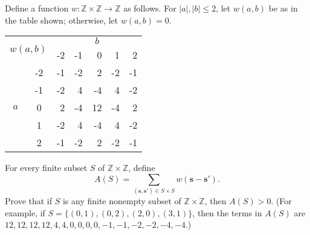 Define a function $w: \mathbb{Z} \times \mathbb{Z} \to \mathbb{Z}$
as follows. For $\left| a \right|, \left| b \right| \leq 2$,
let $w(a,b)$ be as in the table shown; otherwise, let $w(a,b) = 0$.
\begin{center}
\begin{tabular}{|cc|r|r|r|r|r|}
\hline
\multicolumn{2}{|c|}{\multirow{2}{*}{$w(a,b)$}} & \multicolumn{5}{|c|}{$b$} \\
&  & -2 & -1 & 0 & 1 & 2 \\
\hline
& -2 & -1 & -2 & 2 & -2 & -1 \\
& -1 & -2 & 4 & -4 & 4 & -2 \\
$a$ & 0 & 2 & -4 & 12 & -4 & 2 \\
& 1 & -2 & 4 & -4 & 4 & -2 \\ 
& 2 &  -1 & -2 & 2 & -2 & -1 \\
\hline
\end{tabular}
\end{center}
For every finite subset $S$ of $\mathbb{Z} \times \mathbb{Z}$,
define
\[
A(S) = \sum_{(\mathbf{s}, \mathbf{s}') \in S \times S} w(\mathbf{s} - \mathbf{s}').
\]
Prove that if $S$ is any finite nonempty subset of $\mathbb{Z} \times \mathbb{Z}$, then $A(S) > 0$.
(For example, if $S = \{(0,1), (0,2), (2,0), (3,1)\}$, then the terms in $A(S)$ are $12, 12, 12, 12, 4, 4, 0, 0, 0,0,-1,-1,-2,-2,-4,-4$.)
